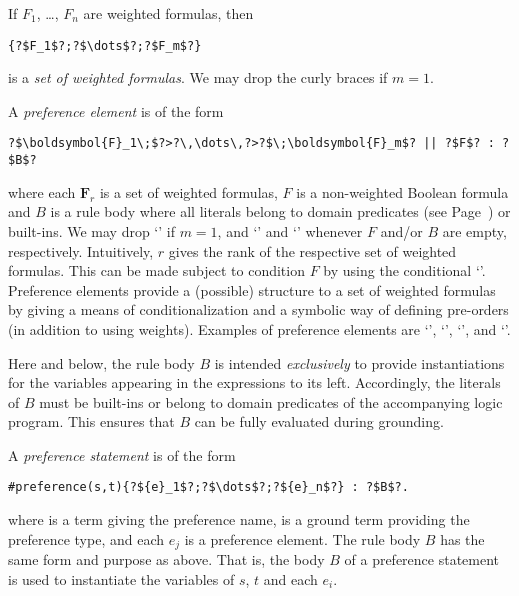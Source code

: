 If $F_1$, \ldots, $F_n$ are weighted formulas, then
\begin{lstlisting}[numbers=none,escapechar=?]
{?$F_1$?;?$\dots$?;?$F_m$?}
\end{lstlisting}
is a \emph{set of weighted formulas}.  
We may drop the curly braces if $m=1$.

A \emph{preference element} is of the form
\begin{lstlisting}[numbers=none,escapechar=?]
?$\boldsymbol{F}_1\;$?>?\,\dots\,?>?$\;\boldsymbol{F}_m$? || ?$F$? : ?$B$?
\end{lstlisting}
where each $\boldsymbol{F}_r$ is a set of weighted formulas, 
$F$ is a non-weighted Boolean formula
and $B$ is a rule body where all literals belong to domain predicates
(see Page~\pageref{pg:domain}) or built-ins.
%
We may drop `\code{>}' if $m=1$, 
and `' and `' whenever $F$ and/or $B$ are empty, respectively.
%
Intuitively, $r$ gives the rank of the respective set of weighted formulas.
This can be made subject to condition $F$ by using the conditional `\code{||}'.
Preference elements provide a (possible) structure to a set of weighted formulas
by giving a means of conditionalization and a symbolic way of defining pre-orders (in addition to using weights).
%
%
Examples of preference elements are 
`',  
`', 
`',  and
`'.

\begin{note}
Here and below, 
the rule body $B$ is intended \emph{exclusively} to provide instantiations for the variables appearing in the expressions to its left.  
Accordingly, the literals of $B$ must be built-ins or belong to domain predicates of the accompanying logic program.
This ensures that $B$ can be fully evaluated during grounding.
\end{note}

A \emph{preference statement} is of the form
%
\begin{lstlisting}[numbers=none,escapechar=?]
#preference(s,t){?${e}_1$?;?$\dots$?;?${e}_n$?} : ?$B$?.
\end{lstlisting}
%
where  is a term giving the preference name, 
 is a ground term providing the preference type, 
and each $e_j$ is a preference element.
The rule body $B$ has the same form and purpose as above.
%
That is, the body $B$ of a preference statement is used to instantiate the variables of $s$, $t$ and each $e_i$.

